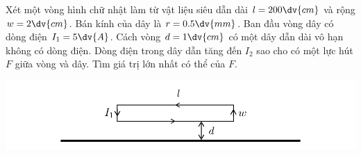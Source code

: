 \begin{vd}
    Xét một vòng hình chữ nhật làm từ vật liệu siêu dẫn dài $l=200\dv{cm}$ và rộng $w=2\dv{cm}$. Bán kính của dây là $r=0.5\dv{mm}$. Ban đầu vòng dây có dòng điện $I_1=5\dv{A}$. Cách vòng $d=1\dv{cm}$ có một dây dẫn dài vô hạn không có dòng điện. Dòng điện trong dây dẫn tăng đến $I_2$ sao cho có một lực hút $F$ giữa vòng và dây. Tìm giá trị lớn nhất có thể của $F$.
    \begin{center}
        \includegraphics[width=\textwidth]{Anh/15.pdf}
    \end{center}
\end{vd}
